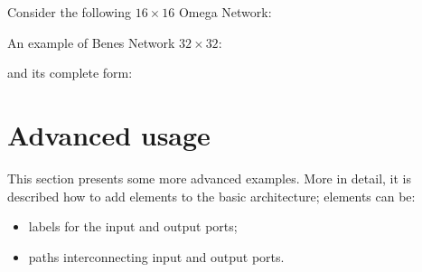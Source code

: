 \documentclass{ltxdoc}
\begin{document}
Consider the following $16 \times 16$ Omega Network:
\begin{codeexample}[]
\tikzset{module size=0.6cm,pin length factor=0.6,
         module ysep=0.65, module xsep=3.5,}
\end{codeexample}

\pagebreak

An example of Benes Network $32 \times 32$:
\begin{codeexample}[]
\tikzset{module size=0.6cm,pin length factor=0.6,
         module ysep=0.9, module xsep=1.7,}
\begin{tikzpicture}[P=32]
    \node[benes] {};
\end{tikzpicture}
\end{codeexample}
\pagebreak

and its complete form:
\begin{codeexample}[]
\tikzset{module size=0.6cm,pin length factor=0.6,
         module ysep=1, module xsep=2.275}
\begin{tikzpicture}[P=32]
    \node[benes complete={module label opacity=0}] {};
\end{tikzpicture}
\end{codeexample}


\section{Advanced usage}
This section presents some more advanced examples. More in detail, it is described how to add elements to the basic architecture; elements can be:
\begin{itemize}
\item labels for the input and output ports;
\item paths interconnecting input and output ports.
\end{itemize}
\end{document}
